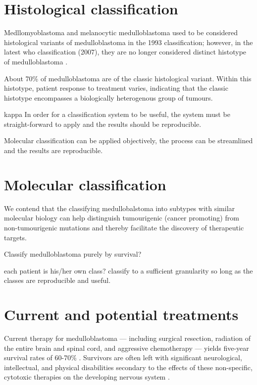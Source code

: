 \section{Histological classification}

Medllomyoblastoma and melanocytic medulloblastoma used to be considered histological variants of medulloblastoma in the 1993 classification; however, in the latest \gls{who} classification (2007), they are no longer considered distinct histotype of medulloblastoma .

About 70\% of medulloblastoma are of the classic histological variant. Within this histotype, patient response to treatment varies, indicating that the classic histotype encompasses a biologically heterogenous group of tumours.

kappa
In order for a classification system to be useful, the system must be straight-forward to apply and the results should be reproducible.

Molecular classification can be applied objectively, the process can be streamlined and the results are reproducible.


\section{Molecular classification}

We contend that the classifying medullobalstoma into subtypes with similar molecular biology can help distinguish tumourigenic (cancer promoting) from non-tumourigenic mutations and thereby facilitate the discovery of therapeutic targets. 

Classify medulloblastoma purely by survival?

each patient is his/her own class?
classify to a sufficient granularity so long as the classes are reproducible and useful.


\section{Current and potential treatments}

Current therapy for medulloblastoma --- including surgical resection, radiation of the entire brain and spinal cord, and aggressive chemotherapy --- yields five-year survival rates of 60-70\% . Survivors are often left with significant neurological, intellectual, and physical disabilities secondary to the effects of these non-specific, cytotoxic therapies on the developing nervous system .

